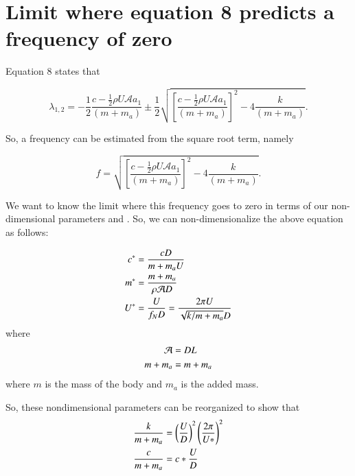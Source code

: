 
\section{Limit where equation 8 predicts a frequency of zero}

Equation 8 states that

\begin{equation}
  \label{eqn:eigs}
  \lambda_{1,2}= -\frac{1}{2}\frac{c-\frac{1}{2}\rho U\mathcal{A}a_1}{(m+m_a)}\pm\frac{1}{2}\sqrt{\left[\frac{c-\frac{1}{2}\rho U\mathcal{A}a_1}{(m+m_a)}\right]^2-4\frac{k}{(m+m_a)}}.
\end{equation}

So, a frequency can be estimated from the square root term, namely

\begin{equation}
  \label{eqn:freq}
  f = \sqrt{\left[\frac{c-\frac{1}{2}\rho U\mathcal{A}a_1}{(m+m_a)}\right]^2-4\frac{k}{(m+m_a)}}.
\end{equation}

We want to know the limit where this frequency goes to zero in terms
of our non-dimensional parameters \massstiff and \massdamp. So, we can
non-dimensionalize the above equation as follows:

\begin{align}
  c^{*}&=\frac{cD}{m+m_a U} \\
  m^{*}&=\frac{m+m_a}{\rho \mathcal{A}D} \\
  U^{*}&=\frac{U}{f_N D} = \frac{2\pi U}{\sqrt{k/m+m_a}D}
\end{align}
where
\begin{align}
  \mathcal{A} &= DL \\
  m+m_a & = m + m_a
\end{align}
where $m$ is the mass of the body and $m_a$ is the added mass.

So, these nondimensional parameters can be reorganized to show that
\begin{align}
  \frac{k}{m+m_a} &= \left(\frac{U}{D}\right)^2\left(\frac{2\pi}{U*}\right)^2 \\
  \frac{c}{m+m_a} &= c*\frac{U}{D}
\end{align}


